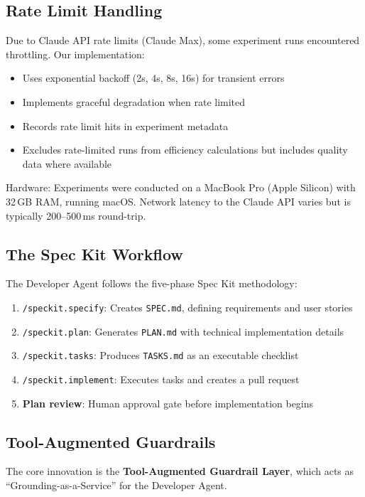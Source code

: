 \documentclass[sigconf,anonymous,review]{acmart}
\begin{document}
\subsection{Rate Limit Handling}

Due to Claude API rate limits (Claude Max), some experiment runs encountered throttling. Our implementation:
\begin{itemize}
  \item Uses exponential backoff (2s, 4s, 8s, 16s) for transient errors
  \item Implements graceful degradation when rate limited
  \item Records rate limit hits in experiment metadata
  \item Excludes rate-limited runs from efficiency calculations but includes quality data where available
\end{itemize}

Hardware: Experiments were conducted on a MacBook Pro (Apple Silicon) with 32\,GB RAM, running macOS. Network latency to the Claude API varies but is typically 200--500\,ms round-trip.

\subsection{The Spec Kit Workflow}

The Developer Agent follows the five-phase Spec Kit methodology:

\begin{enumerate}
  \item \texttt{/speckit.specify}: Creates \texttt{SPEC.md}, defining requirements and user stories
  \item \texttt{/speckit.plan}: Generates \texttt{PLAN.md} with technical implementation details
  \item \texttt{/speckit.tasks}: Produces \texttt{TASKS.md} as an executable checklist
  \item \texttt{/speckit.implement}: Executes tasks and creates a pull request
  \item \textbf{Plan review}: Human approval gate before implementation begins
\end{enumerate}

\subsection{Tool-Augmented Guardrails}

The core innovation is the \textbf{Tool-Augmented Guardrail Layer}, which acts as ``Grounding-as-a-Service'' for the Developer Agent.
\end{document}
